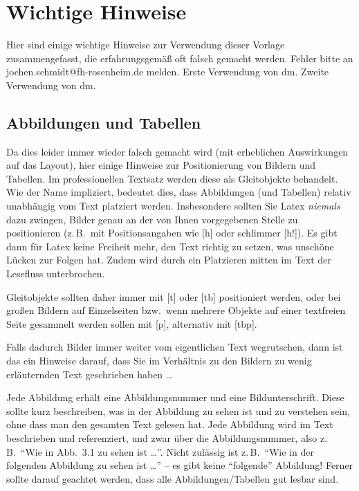 \chapter{Wichtige Hinweise}
\label{c:intro}

Hier sind einige wichtige Hinweise zur Verwendung dieser Vorlage zusammengefasst, die erfahrungsgemäß oft falsch gemacht werden.
Fehler bitte an jochen.schmidt@fh-rosenheim.de melden.
Erste Verwendung von \gls{dm}.
Zweite Verwendung von \gls{dm}.


\section{Abbildungen und Tabellen}
\label{s:intro:abc}

Da dies leider immer wieder falsch gemacht wird (mit erheblichen Auswirkungen auf das Layout), hier einige Hinweise zur Positionierung von Bildern und Tabellen.
Im professionellen Textsatz werden diese als Gleitobjekte behandelt.
Wie der Name impliziert, bedeutet dies, dass Abbildungen (und Tabellen) relativ unabhängig vom Text platziert werden.
Insbesondere sollten Sie Latex \emph{niemals} dazu zwingen, Bilder genau an der von Ihnen vorgegebenen Stelle zu positionieren (z.\,B.\ mit Positionsangaben wie [h] oder schlimmer [h!]).
Es gibt dann für Latex keine Freiheit mehr, den Text richtig zu setzen, was unschöne Lücken zur Folgen hat.
Zudem wird durch ein Platzieren mitten im Text der Lesefluss unterbrochen.

\begin{shaded*}
Gleitobjekte sollten daher immer mit [t] oder [tb] positioniert werden, oder bei großen Bildern auf Einzelseiten bzw.\ wenn mehrere Objekte auf einer textfreien Seite gesammelt werden sollen mit [p], alternativ mit [tbp].
\end{shaded*}

Falls dadurch Bilder immer weiter vom eigentlichen Text wegrutschen, dann ist das ein Hinweise darauf, dass Sie im Verhältnis zu den Bildern zu wenig erläuternden Text geschrieben haben \dots

Jede Abbildung erhält eine Abbildungsnummer und eine Bildunterschrift.
Diese sollte kurz beschreiben, was in der Abbildung zu sehen ist und zu verstehen sein, ohne dass man den gesamten Text gelesen hat.
Jede Abbildung wird im Text beschrieben und referenziert, und zwar über die Abbildungsnummer, also z.\,B.\  "`Wie in Abb.\ 3.1 zu sehen ist \dots"'.
Nicht zulässig ist z.\,B.\ "`Wie in der folgenden Abbildung zu sehen ist \dots"' -- es gibt keine "`folgende"' Abbildung!
Ferner sollte darauf geachtet werden, dass alle Abbildungen/Tabellen gut lesbar sind. \autocite[vgl.][S. 99]{wikibook}


